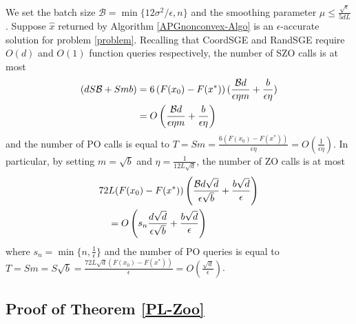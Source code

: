 \begin{corollary}\label{corr11-rand}
We set the batch size $\mathcal{B} = \min\{12\sigma^2/\epsilon, n\}$ and the smoothing parameter $\mu \leq \frac{\sqrt{\epsilon}}{5{dL}}$. Suppose $\hat{x}$ returned by Algorithm \ref{APGnonconvex-Algo}  is an $\epsilon$-accurate solution for problem \eqref{problem}. Recalling that CoordSGE and RandSGE require $O(d)$ and $O(1)$ function queries respectively, the number of SZO calls is at most 
\begin{align}
(dS\mathcal{B}+Smb) & = 6 \left(F(x_0) - F({x}^*)\right) (\frac{\mathcal{B}d}{\epsilon\eta m}+\frac{b}{\epsilon\eta})\notag\\
& = O\left(\frac{\mathcal{B}d}{\epsilon\eta m}+\frac{b}{\epsilon\eta}\right)\label{SZO-call-nocon-rand}
\end{align} 
and the number of PO calls is equal to $T = Sm = \frac{6\left(F(x_0) - F({x}^*)\right)}{\epsilon\eta} = O\left(\frac{1}{\epsilon\eta}\right)$. In particular, by setting $m=\sqrt{b}$ and $\eta = \frac{1}{12L\sqrt{d}}$, the number of ZO calls is at most 
\begin{align}
72 &L (F(x_0)-F(x^*))\left(\frac{\mathcal{B}d\sqrt{d}}{\epsilon\sqrt{b}}+\frac{b\sqrt{d}}{\epsilon}\right)\notag\\
& = O\left(s_n\frac{d\sqrt{d}}{\epsilon \sqrt{b}}+\frac{b\sqrt{d}}{\epsilon}\right)\label{SZO-call-par-nocon-rand}
\end{align}
where $s_n = \min\{n,\frac{1}{\epsilon}\}$ and the number of PO queries is equal to $T = Sm = S\sqrt{b} = \frac{72 L \sqrt{d}\left(F(x_0) - F({x}^*)\right)}{\epsilon} = O\left(\frac{\sqrt{d}}{\epsilon}\right)$. 
\end{corollary}
\noindent\subsection{Proof of Theorem \ref{PL-Zoo}}
